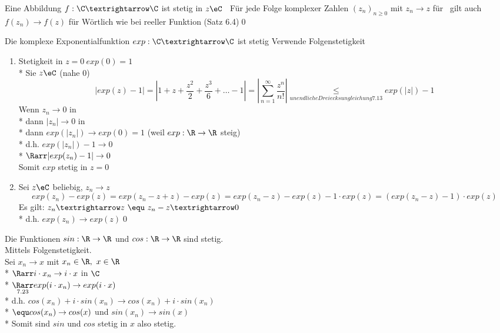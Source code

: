 Eine Abbildung $f:\C→\C$ ist stetig in $z\eC$ \equ\ Für jede Folge komplexer Zahlen $(z_n)_{n\geq 0}$ mit $z_n→z$ für \nif\ gilt auch $f(z_n)→f(z)$ für \nif
\bew
Wörtlich wie bei reeller Funktion (Satz 6.4)\qed

Die komplexe Exponentialfunktion $exp:\C→\C$ ist stetig
\bew
Verwende Folgenstetigkeit
\begin{enumerate}
\item{Stetigkeit in $z=0\ exp (0)=1$\\*
Sie $z\eC$ (nahe 0)
$$\left|exp(z)-1\right|=\left|1+z+\frac{z^2}{2}+\frac{z^3}{6}+…-1\right|=\left|\sum_{n=1}^{∞}\frac{z^n}{n!}\right|\underset{unendliche Dreiecksungleichung 7.13}{\leq}exp(|z|)-1$$
Wenn $z_n→0$ in \C\\*
dann $|z_n|→0$ in \R\\*
dann $exp(|z_n|) \to exp(0) = 1$ (weil $exp: \R \to \R$ steig)\\*
d.h. $exp(|z_n|) -1 \to 0$\\*
$\Rarr|exp(z_n) - 1| \to 0$\\
Somit $exp$ stetig in $z = 0$ }
\item{Sei $z\eC$ beliebig, $z_n→z$
$$exp(z_n)-exp(z)=exp(z_n-z+z)-exp(z)=exp(z_n-z)-exp(z)-1·exp(z)=(exp(z_n-z)-1)·exp(z)$$
Es gilt: $z_n→z\ \equ\ z_n-z→0$\\*
d.h. $exp(z_n)→exp(z)$\qed}
\end{enumerate}

	Die Funktionen $sin: \R \to \R$ und $cos: \R \to \R$ sind stetig.\\
\bew
Mittels Folgenstetigkeit.\\
Sei $x_n \to x$ mit $x_n \in \R,\ x \in \R$\\*
$\Rarr i \cdot x_n \to i \cdot x$ in $\C$\\*
$\underset{7.23}{\Rarr} exp(i \cdot x_n) \to exp(i \cdot x)$\\*
d.h. $cos(x_n) + i \cdot sin(x_n) \to cos(x_n) + i \cdot sin(x_n)$\\*
$\equ cos(x_n) \to cos(x)$ und $sin(x_n) \to sin(x)$\\*
Somit sind $sin$ und $cos$ stetig in $x$ also stetig.